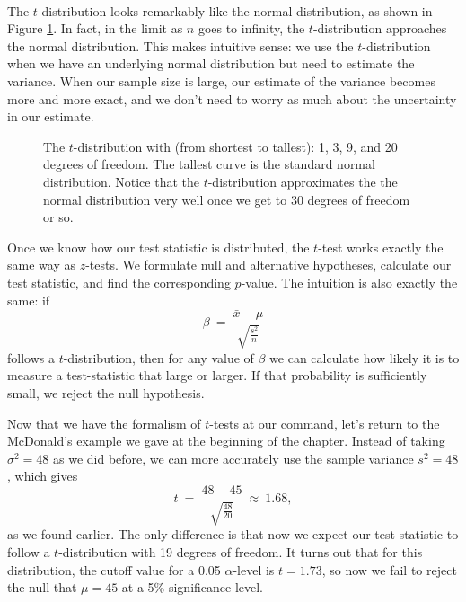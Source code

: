 \ \\

The $t$-distribution looks remarkably like the normal distribution, as shown in Figure \ref{fig:tdistribution}. In fact, in the limit as $n$ goes to infinity, the $t$-distribution approaches the normal distribution. This makes intuitive sense: we use the $t$-distribution when we have an underlying normal distribution but need to estimate the variance. When our sample size is large, our estimate of the variance becomes more and more exact, and we don't need to worry as much about the uncertainty in our estimate.

\begin{figure}[h!]
\begin{center}
\caption{The $t$-distribution with (from shortest to tallest): 1, 3, 9, and 20 degrees of freedom.  The tallest curve is the standard normal distribution.  Notice that the $t$-distribution approximates the the normal distribution very well once we get to 30 degrees of freedom or so.}\label{fig:tdistribution}
\end{center}
\end{figure}


Once we know how our test statistic is distributed, the $t$-test   works exactly the same way as $z$-tests. We formulate null and alternative hypotheses, calculate our test statistic, and find the corresponding $p$-value. The intuition is also exactly the same: if
\begin{equation*}
\beta\ = \ \frac{\bar{x}-\mu}{\sqrt{\frac{s^{2}}{n}}}
\end{equation*}
follows a $t$-distribution, then for any value of $\beta$ we can calculate how likely it is to measure a test-statistic that large or larger. If that probability is sufficiently small, we reject the
null hypothesis.

Now that we have the formalism of $t$-tests at our command, let's return to the McDonald's example we gave at the beginning of the chapter. Instead of taking $\sigma^{2}=48$ as we did before, we can more accurately use the sample variance $s^{2}=48$, which gives
\begin{equation*}
t\ = \ \frac{48-45}{\sqrt{\frac{48}{20}}}\ \approx \ 1.68,
\end{equation*}
as we found earlier. The only difference is that now we expect our test statistic to follow a $t$-distribution with 19 degrees of freedom. It turns out that for this distribution, the cutoff value for a 0.05 $\alpha$-level is $t=1.73$, so now we fail to reject the null that $\mu=45$ at a 5\% significance level.

